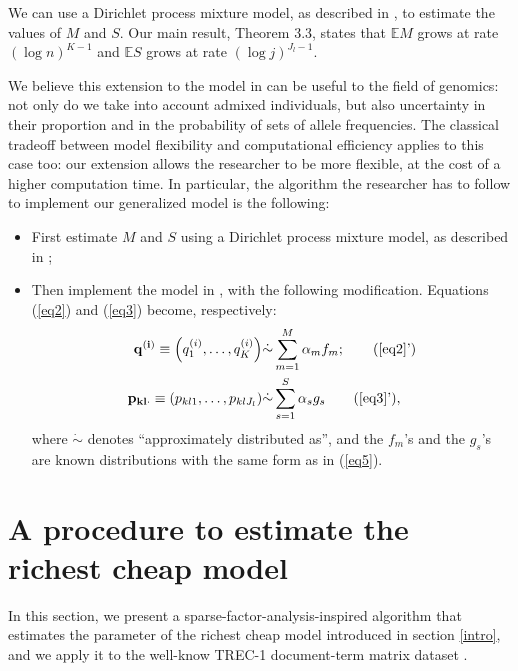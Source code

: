 \documentclass[12pt, reqno]{amsart}
\theoremstyle{definition}
\begin{document}
We can use a Dirichlet process mixture model, as described in \cite{li}, to estimate the values of $M$ and $S$. Our main result, Theorem 3.3, states that $\mathbb{E}M$ grows at rate $(\log n)^{K-1}$ and $\mathbb{E}S$ grows at rate $(\log j)^{J_l-1}$.

We believe this extension to the model in \cite{Pritchard945} can be useful to the field of genomics: not only do we take into account admixed individuals, but also uncertainty in their proportion and in the probability of sets of allele frequencies. The classical tradeoff between model flexibility and computational efficiency applies to this case too: our extension allows the researcher to be more flexible, at the cost of a higher computation time. In particular, the algorithm the researcher has to follow to implement our generalized model is the following:
\begin{itemize}
\item First estimate $M$ and $S$ using a Dirichlet process mixture model, as described in \cite{li};
\item Then implement the model in \cite{Pritchard945}, with the following modification. Equations (\ref{eq2}) and (\ref{eq3}) become, respectively:
\begin{align*}
\mathbf{q^{(i)}} \equiv \left( q^{(i)}_1,\ldots,q^{(i)}_K \right) &\dot\sim \sum_{m=1}^M \alpha_m f_m; \tag{\ref{eq2}'}\\
\mathbf{p_{kl\cdot}} \equiv \left( p_{kl1},\ldots,p_{klJ_l} \right) &\dot\sim \sum_{s=1}^S \alpha_s g_s \tag{\ref{eq3}'} {,}
\end{align*}
where $\dot\sim$ denotes ``approximately distributed as'', and the $f_m$'s and the $g_s$'s are known distributions with the same form as in (\ref{eq5}).
\end{itemize}
\fi

\section{A procedure to estimate the richest cheap model}\label{algorithm}


In this section, we present a sparse-factor-analysis-inspired algorithm that estimates the parameter of the richest cheap model introduced in section \ref{intro}, and we apply it to the well-know TREC-1 document-term matrix dataset \cite{harman}. 
\end{document}
